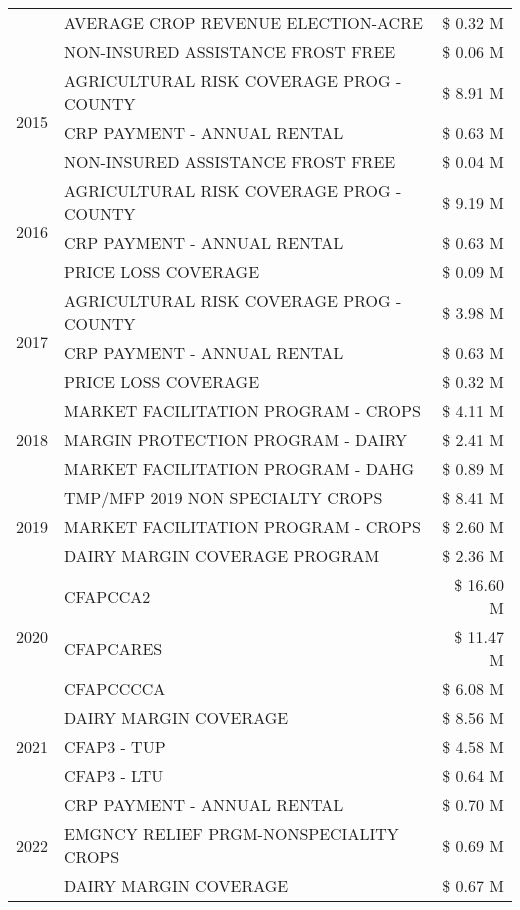 \begin{tabular}{llr}
 & AVERAGE CROP REVENUE ELECTION-ACRE & \$ 0.32 M \\
 & NON-INSURED ASSISTANCE FROST FREE & \$ 0.06 M \\
\cline{1-3}
\multirow[t]{3}{*}{2015} & AGRICULTURAL RISK COVERAGE PROG - COUNTY & \$ 8.91 M \\
 & CRP PAYMENT - ANNUAL RENTAL & \$ 0.63 M \\
 & NON-INSURED ASSISTANCE FROST FREE & \$ 0.04 M \\
\cline{1-3}
\multirow[t]{3}{*}{2016} & AGRICULTURAL RISK COVERAGE PROG - COUNTY & \$ 9.19 M \\
 & CRP PAYMENT - ANNUAL RENTAL & \$ 0.63 M \\
 & PRICE LOSS COVERAGE & \$ 0.09 M \\
\cline{1-3}
\multirow[t]{3}{*}{2017} & AGRICULTURAL RISK COVERAGE PROG - COUNTY & \$ 3.98 M \\
 & CRP PAYMENT - ANNUAL RENTAL & \$ 0.63 M \\
 & PRICE LOSS COVERAGE & \$ 0.32 M \\
\cline{1-3}
\multirow[t]{3}{*}{2018} & MARKET FACILITATION PROGRAM - CROPS & \$ 4.11 M \\
 & MARGIN PROTECTION PROGRAM - DAIRY & \$ 2.41 M \\
 & MARKET FACILITATION PROGRAM - DAHG & \$ 0.89 M \\
\cline{1-3}
\multirow[t]{3}{*}{2019} & TMP/MFP 2019 NON SPECIALTY CROPS & \$ 8.41 M \\
 & MARKET FACILITATION PROGRAM - CROPS & \$ 2.60 M \\
 & DAIRY MARGIN COVERAGE PROGRAM & \$ 2.36 M \\
\cline{1-3}
\multirow[t]{3}{*}{2020} & CFAPCCA2 & \$ 16.60 M \\
 & CFAPCARES & \$ 11.47 M \\
 & CFAPCCCCA & \$ 6.08 M \\
\cline{1-3}
\multirow[t]{3}{*}{2021} & DAIRY MARGIN COVERAGE & \$ 8.56 M \\
 & CFAP3 - TUP & \$ 4.58 M \\
 & CFAP3 - LTU & \$ 0.64 M \\
\cline{1-3}
\multirow[t]{3}{*}{2022} & CRP PAYMENT - ANNUAL RENTAL & \$ 0.70 M \\
 & EMGNCY RELIEF PRGM-NONSPECIALITY CROPS & \$ 0.69 M \\
 & DAIRY MARGIN COVERAGE & \$ 0.67 M \\
\cline{1-3}
\bottomrule
\end{tabular}
